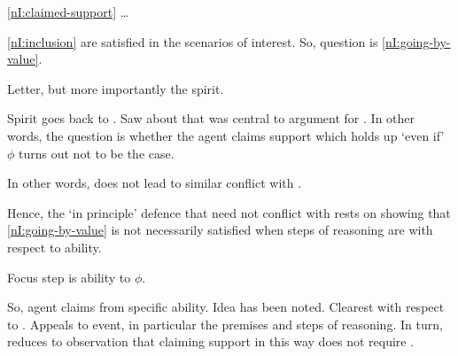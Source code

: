 \begin{note}
  \ref{nI:claimed-support} \dots



  \ref{nI:inclusion} are satisfied in the scenarios of interest.
  So, question is \ref{nI:going-by-value}.

  Letter, but more importantly the spirit.

  Spirit goes back to \eiS{}.
  Saw about that \eiS{} was central to argument for \nI{}.
  In other words, the question is whether the agent claims support which holds up `even if' \(\phi\) turns out not to be the case.

  In other words, \adB{} does not lead to similar conflict with \eiS{}.

  Hence, the `in principle' defence that \adB{} need not conflict with \nI{} rests on showing that \ref{nI:going-by-value} is not necessarily satisfied when steps of reasoning are \adB{} with respect to ability.

  Focus step is ability to \(\phi\).

  So, agent claims from specific ability.
  Idea has been noted.
  Clearest with respect to \WR{}.
  Appeals to event, in particular the premises and steps of reasoning.
  In turn, reduces to observation that claiming support in this way does not require \RBV{}.
\end{note}

